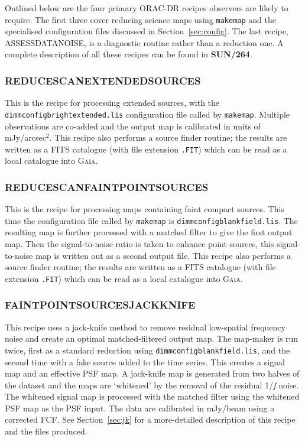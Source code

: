 \documentclass[twoside,11pt]{article}
\newcommand{\htmlref}[2]{#1}
\newcommand{\latexhtml}[2]{#1}
\newcommand{\xref}[3]{#1}
\newcommand{\xlabel}[1]{}
\renewcommand{\_}{\texttt{\symbol{95}}}
\newcommand{\gaia}{\xref{\textsc{Gaia}}{sun214}{}}
\newcommand{\pipelinesun}{\xref{\textbf{SUN/264}}{sun264}{}}
\newcommand{\cref}[3]{\latexhtml{#1~\ref{#2}}{\htmlref{#3}{#2}}}
\begin{document}
Outlined below are the four primary ORAC-DR recipes observers are
likely to require.  The first three cover reducing science maps using
\texttt{makemap} and the specialised configuration files discussed in
\cref{Section}{sec:config}{Specialised configuration files}. The last
recipe, ASSESS\_DATA\_NOISE, is a diagnostic routine rather than a
reduction one. A complete description of all these recipes can be
found in \pipelinesun.


\subsubsection{\xlabel{extsources}REDUCE\_SCAN\_EXTENDED\_SOURCES}

This is the recipe for processing extended sources, with the
\texttt{dimmconfig\_bright\_extended.lis} configuration file called by
\texttt{makemap}. Multiple observations are co-added and the output
map is calibrated in units of mJy/arcsec$^2$. This recipe also
performs a source finder routine; the results are written as a FITS
catalogue (with file extension \texttt{.FIT}) which can be read as a
local catalogue into \gaia.

\subsubsection{\xlabel{faint}REDUCE\_SCAN\_FAINT\_POINT\_SOURCES}

This is the recipe for processing maps containing faint compact
sources. This time the configuration file called by \texttt{makemap}
is \texttt{dimmconfig\_blank\_field.lis}. The resulting map is further
processed with a matched filter to give the first output map. Then the
signal-to-noise ratio is taken to enhance point sources, this
signal-to-noise map is written out as a second output file. This
recipe also performs a source finder routine; the results are written
as a FITS catalogue (with file extension \texttt{.FIT}) which can be
read as a local catalogue into \gaia.

\subsubsection{\xlabel{faintjk}FAINT\_POINT\_SOURCES\_JACKKNIFE}

This recipe uses a jack-knife method to remove residual low-spatial
frequency noise and create an optimal matched-filtered output map. The
map-maker is run twice, first as a standard reduction using
\texttt{dimmconfig\_blank\_field.lis}, and the second time with a fake
source added to the time series. This creates a signal map and an
effective PSF map. A jack-knife map is generated from two halves of
the dataset and the maps are `whitened' by the removal of the residual
1/\emph{f} noise. The whitened signal map is processed with the
matched filter using the whitened PSF map as the PSF input. The data
are calibrated in mJy/beam using a corrected FCF. See
\cref{Section}{sec:jk}{this section} for a more-detailed description
of this recipe and the files produced.
\end{document}
